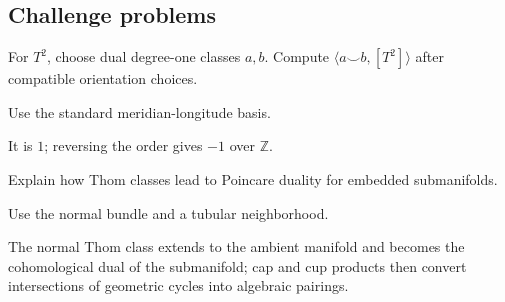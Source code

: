 \subsection*{Challenge problems}

\begin{exercise}\label{exr:viii33-ped-15}
For $T^2$, choose dual degree-one classes $a,b$. Compute $\langle a\smile b,[T^2]\rangle$ after compatible orientation choices.
\end{exercise}
\begin{hint}
Use the standard meridian-longitude basis.
\end{hint}
\begin{solution}
It is $1$; reversing the order gives $-1$ over $\mathbb Z$.
\end{solution}

\begin{exercise}\label{exr:viii33-ped-16}
Explain how Thom classes lead to Poincare duality for embedded submanifolds.
\end{exercise}
\begin{hint}
Use the normal bundle and a tubular neighborhood.
\end{hint}
\begin{solution}
The normal Thom class extends to the ambient manifold and becomes the cohomological dual of the submanifold; cap and cup products then convert intersections of geometric cycles into algebraic pairings.
\end{solution}


